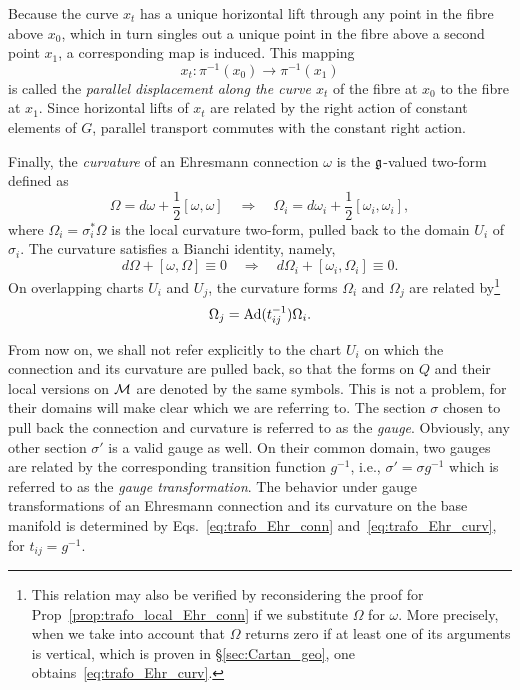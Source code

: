 \documentclass[
final,
11pt,
a4paper,
DIV=11,
headinclude=true,
footinclude=false,
bibliography=totoc,
twoside=true,  %
BCOR=5mm
]{scrbook}
\begin{document}
Because the curve $x_t$ has a unique horizontal lift through any 
point in the fibre above $x_0$, which in turn singles out a 
unique point in the fibre above a second point $x_1$, a 
corresponding map is induced.  This mapping
\begin{equation*}
  x_t : \pi^{-1}(x_0) \to \pi^{-1}(x_1)
\end{equation*}
is called the \emph{parallel displacement along the curve $x_t$} 
of the fibre at $x_0$ to the fibre at $x_1$. Since horizontal 
lifts of $x_t$ are related by the right action of constant 
elements of $G$, parallel transport commutes with the constant 
right action.

Finally, the \emph{curvature} of an Ehresmann connection $\omega$ 
is the $\mathfrak{g}$-valued two-form defined as
\begin{equation}
  \Omega = d\omega + \frac{1}{2}[\omega,\omega]
  \quad\Longrightarrow\quad
  \Omega_i = d\omega_i + \frac{1}{2}[\omega_i,\omega_i],
\end{equation}
where $\Omega_i = \sigma_i^* \Omega$ is the local curvature 
two-form, pulled back to the domain $U_i$ of $\sigma_i$. The 
curvature satisfies a Bianchi identity, namely,
\begin{equation}
  d\Omega + [\omega,\Omega] \equiv 0
  \quad\Longrightarrow\quad
  d\Omega_i + [\omega_i,\Omega_i] \equiv 0.
\end{equation}
On overlapping charts $U_i$ and $U_j$, the curvature forms 
$\Omega_i$ and $\Omega_j$ are related
by\footnote{This relation may also be verified by reconsidering 
  the proof for Prop~\ref{prop:trafo_local_Ehr_conn} if we 
  substitute $\Omega$ for $\omega$. More precisely, when we take 
  into account that $\Omega$ returns zero if at least one of its 
  arguments is vertical, which is proven in 
  \S\ref{sec:Cartan_geo}, one 
  obtains~\eqref{eq:trafo_Ehr_curv}.}~\cite{sharpe1997diff_geo}%
\begin{equation}
\label{eq:trafo_Ehr_curv}
  \Omega_j = \operatorname{Ad}(t_{ij}^{-1}) \Omega_i.
\end{equation}

From now on, we shall not refer explicitly to the chart $U_i$ on 
which the connection and its curvature are pulled back, so that 
the forms on $Q$ and their local versions on $\mathcal{M}$ are denoted 
by the same symbols. This is not a problem, for their domains 
will make clear which we are referring to. The section $\sigma$ 
chosen to pull back the connection and curvature is referred to 
as the \emph{gauge}. Obviously, any other section $\sigma'$ is a 
valid gauge as well. On their common domain, two gauges are 
related by the corresponding transition function $g^{-1}$, i.e., 
$\sigma' = \sigma g^{-1}$ which is referred to as the \emph{gauge 
  transformation}.  The behavior under gauge transformations of 
an Ehresmann connection and its curvature on the base manifold is 
determined by Eqs.~\eqref{eq:trafo_Ehr_conn} 
and~\eqref{eq:trafo_Ehr_curv}, for $t_{ij} = g^{-1}$.  
\end{document}
